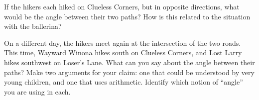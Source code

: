 \documentclass{ximera}
\begin{document}
\newpage

\begin{problem} \label{GetLost6}
If the hikers each hiked on Clueless Corners, but in opposite directions, what would be the angle between their two paths?  How is this related to the situation with the ballerina?


\end{problem}


\begin{problem} \label{GetLost7}
On a different day, the hikers meet again at the intersection of the two roads.  This time, Wayward Winona hikes south on Clueless Corners, and Lost Larry hikes southwest on Loser's Lane.  What can you say about the angle between their paths?  Make two arguments for your claim: one that could be understood by very young children, and one that uses arithmetic.  Identify which notion of ``angle'' you are using in each.


\begin{center}
\end{center}
\end{problem}


\newpage
\end{document}
